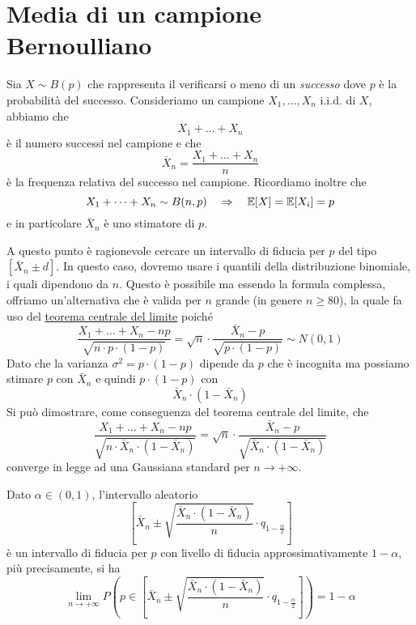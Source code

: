\section{Media di un campione Bernoulliano}
Sia $X \sim B(p)$ che rappresenta il verificarsi o meno di un \emph{successo} dove $p$ è la
probabilità del successo. Consideriamo un campione $X_1, \dots, X_n$ i.i.d. di $X$, abbiamo che
\[ X_1 + \dots + X_n \]
è il numero successi nel campione e che
\[ \bar{X}_n = \frac{X_1 + \dots + X_n}{n} \]
è la frequenza relativa del successo nel campione. Ricordiamo inoltre che
\[ X_1 + \dots + X_n \sim B(n,p) \quad \Rightarrow \quad \mathbb{E}[X] = \mathbb{E}[X_i] = p \]
e in particolare $\bar{X}_n$ è uno stimatore di $p$.

A questo punto è ragionevole cercare un intervallo di fiducia per $p$ del tipo
$[\bar{X}_n \pm d]$. In questo caso, dovremo usare i quantili della distribuzione binomiale,
i quali dipendono da $n$. Questo è possibile ma essendo la formula complessa, offriamo
un'alternativa che è valida per $n$ grande (in genere $n \geq 80$), la quale fa uso del
\hyperref[th: tcl]{teorema centrale del limite} poiché
\[
	\frac{X_1 + \dots + X_n - np}{\sqrt{n \cdot p \cdot (1-p)}} =
	\sqrt{n} \cdot \frac{\bar{X}_n - p}{\sqrt{p \cdot (1-p)}} \sim N(0,1)
\]
Dato che la varianza $\sigma^2 = p \cdot (1-p)$ dipende da $p$ che è incognita ma possiamo stimare
$p$ con $\bar{X}_n$ e quindi $p \cdot (1-p)$ con
\[ \bar{X}_n \cdot (1 - \bar{X}_n) \]
Si può dimostrare, come conseguenza del teorema centrale del limite, che
\[
	\frac{X_1 + \dots + X_n - np}{\sqrt{n \cdot \bar{X}_n \cdot (1 - \bar{X}_n)}} =
	\sqrt{n} \cdot \frac{\bar{X}_n - p}{\sqrt{\bar{X}_n \cdot (1 - \bar{X}_n)}}
\]
converge in legge ad una Gaussiana standard per $n \to +\infty$.

\begin{proposition}
	Dato $\alpha \in (0,1)$, l'intervallo aleatorio
	\[
		\left[
			\bar{X}_n \pm \sqrt{\frac{\bar{X}_n \cdot (1 - \bar{X}_n)}{n}}
			\cdot q_{1 - \frac{\alpha}{2}}
			\right]
	\]
	è un intervallo di fiducia per $p$ con livello di fiducia approssimativamente $1-\alpha$, più
	precisamente, si ha
	\[
		\lim_{n \to +\infty} P \left( p \in \left[ \bar{X}_n \pm
			\sqrt{\frac{\bar{X}_n \cdot (1 - \bar{X}_n)}{n}} \cdot
			q_{1 - \frac{\alpha}{2}} \right] \right) = 1 - \alpha
	\]
\end{proposition}


